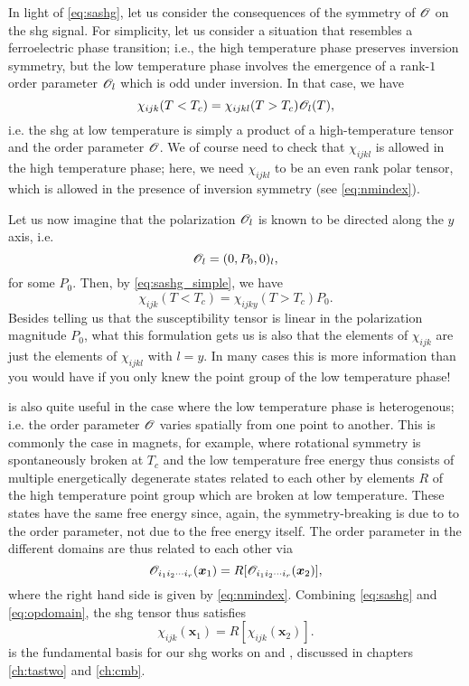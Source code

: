 In light of \cref{eq:sashg}, let us consider the consequences of the symmetry of $\mathscr{O}$ on the \gls{shg} signal.
For simplicity, let us consider a situation that resembles a ferroelectric phase transition; i.e., the high temperature phase preserves inversion symmetry, but the low temperature phase involves the emergence of a rank-$1$ order parameter $\mathscr{O}_l$ which is odd under inversion.
In that case, we have
\begin{equation}\label{eq:sashg_simple}
\chi_{ijk}(T<T_c) = \chi_{ijkl}(T>T_c)\mathscr{O}_{l}(T),
\end{equation}
i.e. the \gls{shg} at low temperature is simply a product of a high-temperature tensor and the order parameter $\mathscr{O}$.
We of course need to check that $\chi_{ijkl}$ is allowed in the high temperature phase; here, we need $\chi_{ijkl}$ to be an even rank polar tensor, which is allowed in the presence of inversion symmetry (see \cref{eq:nmindex}).

Let us now imagine that the polarization $\mathscr{O}_{l}$ is known to be directed along the $y$ axis, i.e.
\begin{equation}
\mathscr{O}_l = (0, P_0, 0)_l,
\end{equation}
for some $P_0$.
Then, by \cref{eq:sashg_simple}, we have
\begin{equation}
\chi_{ijk}(T<T_c) = \chi_{ijky}(T>T_c)P_0.
\end{equation}
Besides telling us that the susceptibility tensor is linear in the polarization magnitude $P_0$, what this formulation gets us is also that the elements of $\chi_{ijk}$ are just the elements of $\chi_{ijkl}$ with $l=y$.
In many cases this is more information than you would have if you only knew the point group of the low temperature phase!

 is also quite useful in the case where the low temperature phase is heterogenous; i.e. the order parameter $\mathscr{O}$ varies spatially from one point to another.
This is commonly the case in magnets, for example, where rotational symmetry is spontaneously broken at $T_c$ and the low temperature free energy thus consists of multiple energetically degenerate states related to each other by elements $R$ of the high temperature point group which are broken at low temperature.
These states have the same free energy since, again, the symmetry-breaking is due to to the order parameter, not due to the free energy itself.
The order parameter in the different domains are thus related to each other via
\begin{equation}\label{eq:opdomain}
\mathscr{O}_{i_1i_2\cdots i_r}(\bm{x}_1) = R[\mathscr{O}_{i_1i_2\cdots i_r}(\bm{x}_2)],
\end{equation}
where the right hand side is given by \cref{eq:nmindex}.
Combining \cref{eq:sashg} and \cref{eq:opdomain}, the \gls{shg} tensor thus satisfies
\begin{equation}\label{eq:shgdomain}
\chi_{ijk}(\bm{x}_1) = R[\chi_{ijk}(\bm{x}_2)].
\end{equation}
 is the fundamental basis for our \gls{shg} works on \tastwo and , discussed in chapters \cref{ch:tastwo} and \cref{ch:cmb}.
